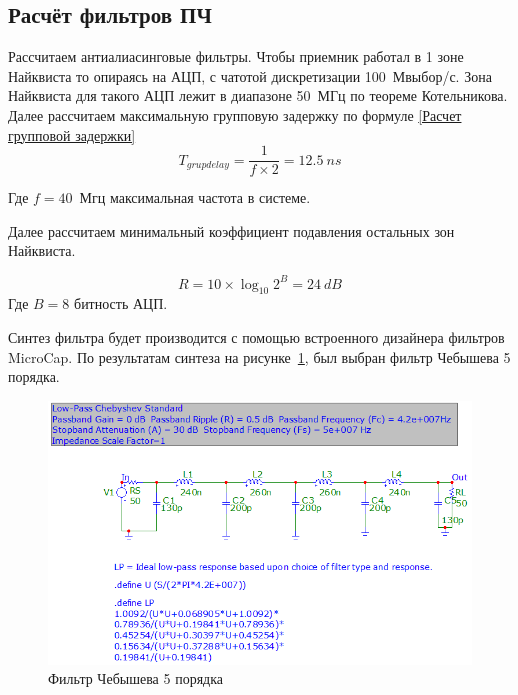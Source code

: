 \documentclass[utf8x, 14pt, oneside, a4paper]{article}
\begin{document}
		\subsection{Расчёт фильтров ПЧ}

		Рассчитаем антиалиасинговые фильтры. Чтобы приемник работал в 1 зоне Найквиста то опираясь на АЦП, с чатотой дискретизации 100~Мвыбор/с. Зона Найквиста для такого АЦП лежит в диапазоне 50~МГц по теореме Котельникова.
		Далее рассчитаем максимальную групповую задержку по формуле \ref{Расчет групповой задержки}
		\begin{equation}\label{Расчет групповой задержки}
		T_{grupdelay} = \frac{1}{f\times 2} = 12.5~ns
		\end{equation} 
		 
		Где $f = 40$~Мгц  максимальная частота в системе.
		
		Далее рассчитаем минимальный коэффициент подавления остальных зон Найквиста.
		
		\begin{equation}\label{Расчет подавления}
		R = 10\times\log_{10}2^{B} = 24~dB
		\end{equation} 
		Где $B = 8$ битность АЦП.
		
		Синтез фильтра будет производится с помощью встроенного дизайнера фильтров MicroCap.
		По результатам синтеза на рисунке~\ref{fig:Чебурашка}, был выбран фильтр Чебышева 5 порядка.
		
		
		\begin{figure}[h!]
			\centering
			\includegraphics[width=1\linewidth]{"Не балансный"}
			\caption{Фильтр Чебышева 5 порядка}
			\label{fig:Чебурашка}
		\end{figure}
	
\end{document}
